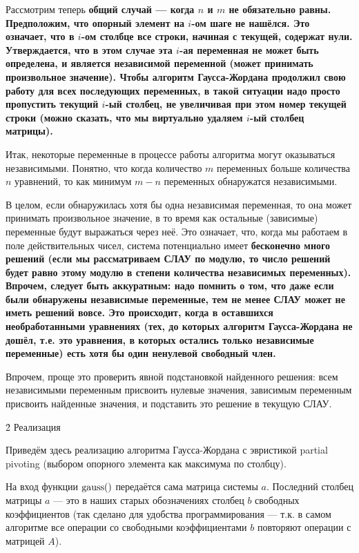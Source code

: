Рассмотрим теперь \bf{общий случай} --- когда $n$ и $m$ не обязательно равны. Предположим, что опорный элемент на $i$-ом шаге не нашёлся. Это означает, что в $i$-ом столбце все строки, начиная с текущей, содержат нули. Утверждается, что в этом случае эта $i$-ая переменная не может быть определена, и является \bf{независимой переменной} (может принимать произвольное значение). Чтобы алгоритм Гаусса-Жордана продолжил свою работу для всех последующих переменных, в такой ситуации надо просто пропустить текущий $i$-ый столбец, не увеличивая при этом номер текущей строки (можно сказать, что мы виртуально удаляем $i$-ый столбец матрицы).

Итак, некоторые переменные в процессе работы алгоритма могут оказываться независимыми. Понятно, что когда количество $m$ переменных больше количества $n$ уравнений, то как минимум $m-n$ переменных обнаружатся независимыми.

В целом, если обнаружилась хотя бы одна независимая переменная, то она может принимать произвольное значение, в то время как остальные (зависимые) переменные будут выражаться через неё. Это означает, что, когда мы работаем в поле действительных чисел, система потенциально имеет \bf{бесконечно много решений} (если мы рассматриваем СЛАУ по модулю, то число решений будет равно этому модулю в степени количества независимых переменных). Впрочем, следует быть аккуратным: надо помнить о том, что даже если были обнаружены независимые переменные, тем не менее СЛАУ \bf{может не иметь решений вовсе}. Это происходит, когда в оставшихся необработанными уравнениях (тех, до которых алгоритм Гаусса-Жордана не дошёл, т.е. это уравнения, в которых остались только независимые переменные) есть хотя бы один ненулевой свободный член.

Впрочем, проще это проверить явной подстановкой найденного решения: всем независимыми переменным присвоить нулевые значения, зависимым переменным присвоить найденные значения, и подставить это решение в текущую СЛАУ.



\h2{ Реализация }

Приведём здесь реализацию алгоритма Гаусса-Жордана с эвристикой partial pivoting (выбором опорного элемента как максимума по столбцу).

На вход функции $\rm gauss()$ передаётся сама матрица системы $a$. Последний столбец матрицы $a$ --- это в наших старых обозначениях столбец $b$ свободных коэффициентов (так сделано для удобства программирования --- т.к. в самом алгоритме все операции со свободными коэффициентами $b$ повторяют операции с матрицей $A$).

